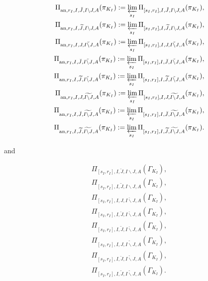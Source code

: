 \documentclass[12pt]{amsart}
\theoremstyle{definition}
\numberwithin{equation}{section}
\begin{document}
\begin{align}
\Pi_{\mathrm{an},r_I,I,\breve{J},I\backslash J,A}(\pi_{K_I}):=\varprojlim_{s_I}\Pi_{[s_I,r_I],I,\breve{J},I\backslash J,A}(\pi_{K_I}),\\	
\Pi_{\mathrm{an},r_I,I,\widetilde{J},I\backslash J,A}(\pi_{K_I}):=\varprojlim_{s_I} \Pi_{[s_I,r_I],I,\widetilde{J},I\backslash J,A}(\pi_{K_I}),\\
\Pi_{\mathrm{an},r_I,I,J,\breve{I\backslash J},A}(\pi_{K_I}):=\varprojlim_{s_I}\Pi_{[s_I,r_I],I,J,\breve{I\backslash J},A}(\pi_{K_I}),\\	
\Pi_{\mathrm{an},r_I,I,\breve{J},\breve{I\backslash J},A}(\pi_{K_I}):=\varprojlim_{s_I} \Pi_{[s_I,r_I],I,\breve{J},\breve{I\backslash J},A}(\pi_{K_I}),\\	
\Pi_{\mathrm{an},r_I,I,\widetilde{J},\breve{I\backslash J},A}(\pi_{K_I}):=\varprojlim_{s_I} \Pi_{[s_I,r_I],I,\widetilde{J},\breve{I\backslash J},A}(\pi_{K_I}),\\
\Pi_{\mathrm{an},r_I,I,J,\widetilde{I\backslash J},A}(\pi_{K_I}):=\varprojlim_{s_I} \Pi_{[s_I,r_I],I,J,\widetilde{I\backslash J},A}(\pi_{K_I}),\\	
\Pi_{\mathrm{an},r_I,I,\breve{J},\widetilde{I\backslash J},A}(\pi_{K_I}):=\varprojlim_{s_I} \Pi_{[s_I,r_I],I,\breve{J},\widetilde{I\backslash J},A}(\pi_{K_I}),\\	
\Pi_{\mathrm{an},r_I,I,\widetilde{J},\widetilde{I\backslash J},A}(\pi_{K_I}):=\varprojlim_{s_I} \Pi_{[s_I,r_I],I,\widetilde{J},\widetilde{I\backslash J},A}(\pi_{K_I}).	
\end{align}


and


\begin{align}
\Pi_{[s_I,r_I],I,\breve{J},I\backslash J,A}(\Gamma_{K_I}),\\	
\Pi_{[s_I,r_I],I,\widetilde{J},I\backslash J,A}(\Gamma_{K_I}),\\
\Pi_{[s_I,r_I],I,J,\breve{I\backslash J},A}(\Gamma_{K_I}),\\	
\Pi_{[s_I,r_I],I,\breve{J},\breve{I\backslash J},A}(\Gamma_{K_I}),\\
\Pi_{[s_I,r_I],I,\widetilde{J},\breve{I\backslash J},A}(\Gamma_{K_I}),\\
\Pi_{[s_I,r_I],I,J,\widetilde{I\backslash J},A}(\Gamma_{K_I}),\\	
\Pi_{[s_I,r_I],I,\breve{J},\widetilde{I\backslash J},A}(\Gamma_{K_I}),\\	
\Pi_{[s_I,r_I],I,\widetilde{J},\widetilde{I\backslash J},A}(\Gamma_{K_I}).	
\end{align}	
\end{document}
